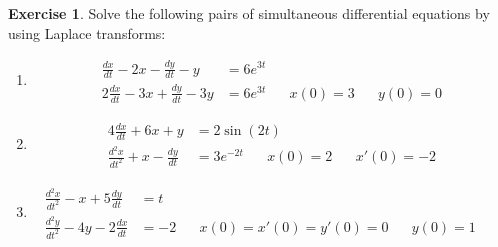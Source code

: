 \documentclass{report}
\theoremstyle{definition}
\newtheorem{exercise}{Exercise}[chapter]
\theoremstyle{remark}
\newcommand{\twen}{\hspace{20pt}}
\newcommand{\od}[2]{\frac{d #1}{d#2}}
\newcommand{\odt}[2]{\frac{d^2 #1}{d#2^2}}
\begin{document}
\begin{exercise}
    Solve the following pairs of simultaneous differential equations by using Laplace transforms:
    \begin{enumerate}[label=(\alph*)]
        \item \begin{equation*}
            \begin{split}
                \od{x}{t} -2x -\od{y}{t} -y&=6e^{3t} \\
                2\od{x}{t} - 3x+\od{y}{t}-3y &=6e^{3t} \twen x(0)=3\twen y(0)=0
            \end{split}
        \end{equation*}
        \item \begin{equation*}
            \begin{split}
                4\od{x}{t}+6x+y &=2\sin (2t) \\
                \odt{x}{t} + x-\od{y}{t}&=3e^{-2t} \twen x(0)=2 \twen x'(0)=-2
            \end{split}
        \end{equation*}
        \item \begin{equation*}
            \begin{split}
                \odt{x}{t}-x+5\od{y}{t} &=t\\
                \odt{y}{t}-4y-2\od{x}{t}&=-2 \twen x(0)=x'(0)=y'(0)=0 \twen y(0)=1 \twen
            \end{split}
        \end{equation*}
    \end{enumerate}
\end{exercise}
\end{document}
